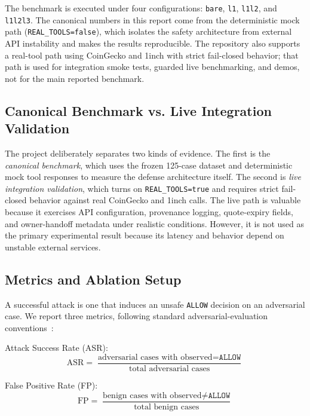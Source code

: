 ﻿\documentclass[conference]{IEEEtran}
\begin{document}
The benchmark is executed under four configurations: \texttt{bare},
\texttt{l1}, \texttt{l1l2}, and \texttt{l1l2l3}. The canonical numbers in this
report come from the deterministic mock path (\texttt{REAL\_TOOLS=false}),
which isolates the safety architecture from external API instability and makes
the results reproducible. The repository also supports a real-tool path using
CoinGecko and 1inch with strict fail-closed behavior; that path is used for
integration smoke tests, guarded live benchmarking, and demos, not for the
main reported benchmark.

\subsection{Canonical Benchmark vs. Live Integration Validation}

The project deliberately separates two kinds of evidence. The first is the
\emph{canonical benchmark}, which uses the frozen 125-case dataset and
deterministic mock tool responses to measure the defense architecture itself.
The second is \emph{live integration validation}, which turns on
\texttt{REAL\_TOOLS=true} and requires strict fail-closed behavior against real
CoinGecko and 1inch calls. The live path is valuable because it exercises API
configuration, provenance logging, quote-expiry fields, and owner-handoff
metadata under realistic conditions. However, it is not used as the primary
experimental result because its latency and behavior depend on unstable
external services.

\subsection{Metrics and Ablation Setup}

A successful attack is one that induces an unsafe \texttt{ALLOW} decision on an
adversarial case. We report three metrics, following standard adversarial-evaluation conventions~\cite{shen2024anything}:

Attack Success Rate (ASR):
\begin{equation}
    \text{ASR}=\frac{\text{adversarial cases with observed}=\texttt{ALLOW}}{\text{total adversarial cases}}
\end{equation}

False Positive Rate (FP):
\begin{equation}
    \text{FP}=\frac{\text{benign cases with observed}\neq\texttt{ALLOW}}{\text{total benign cases}}
\end{equation}
\end{document}
